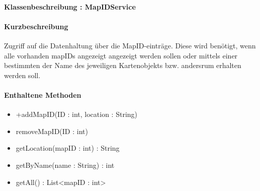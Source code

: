 \paragraph{Klassenbeschreibung : MapIDService}%
\paragraph*{Kurzbeschreibung}
Zugriff auf die Datenhaltung über die MapID-einträge. Diese wird benötigt, wenn alle vorhanden mapIDs angezeigt angezeigt werden sollen oder
mittels einer bestimmten der Name des jeweiligen Kartenobjekts bzw. andersrum erhalten werden soll.

\paragraph*{Enthaltene Methoden}
\begin{itemize}
    \item +addMapID(ID : int, location : String)
    \item removeMapID(ID : int)
    \item getLocation(mapID : int) : String
    \item getByName(name : String) : int
    \item getAll() : List<mapID : int>
\end{itemize}
